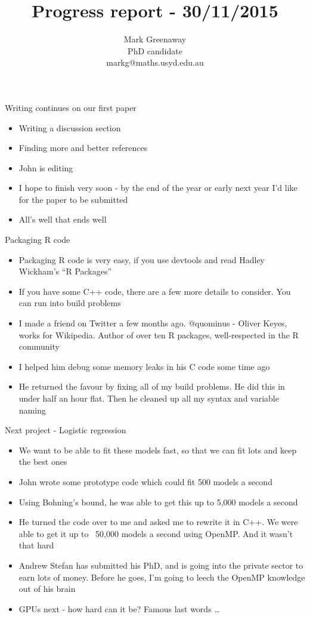 \documentclass{beamer}
\title{Progress report - 30/11/2015}
\author{Mark Greenaway\\PhD candidate\\markg@maths.usyd.edu.au}
\begin{document}
\begin{frame}
\maketitle
\end{frame}

\begin{frame}{Writing continues on our first paper}
\begin{itemize}
\item Writing a discussion section
\item Finding more and better references
\item John is editing
\item I hope to finish very soon - by the end of the year or early next year I'd like for the paper to be
			submitted
\item All's well that ends well
\end{itemize}
\end{frame}

\begin{frame}{Packaging R code}
\begin{itemize}
\item Packaging R code is very easy, if you use devtools and read Hadley Wickham's ``R Packages''
\item If you have some C++ code, there are a few more details to consider. You can run into build problems
\item I made a friend on Twitter a few months ago. @quominus - Oliver Keyes, works for Wikipedia. Author of
			over ten R packages, well-respected in the R community
\item I helped him debug some memory leaks in his C code some time ago
\item He returned the favour by fixing all of my build problems. He did this in under half an hour flat. Then
			he cleaned up all my syntax and variable naming
\end{itemize}
\end{frame}

\begin{frame}{Next project - Logistic regression}
\begin{itemize}
\item We want to be able to fit these models fast, so that we can fit lots and keep the best ones
\item John wrote some prototype code which could fit 500 models a second
\item Using Bohning's bound, he was able to get this up to 5,000 models a second
\item He turned the code over to me and asked me to rewrite it in C++. We were able to get it up to ~50,000
			models a second using OpenMP. And it wasn't that hard
\item Andrew Stefan has submitted his PhD, and is going into the private sector to earn lots of money. Before
			he goes, I'm going to leech the OpenMP knowledge out of his brain
\item GPUs next - how hard can it be? Famous last words \ldots
\end{itemize}
\end{frame}
\end{document}
